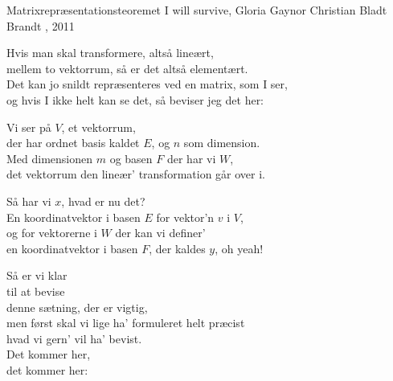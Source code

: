\begin{song}{Matrixrepræsentationsteoremet}
  {} %
  {I will survive, Gloria Gaynor} %
  {Christian Bladt Brandt} %
  {\TKET{}, 2011} %
  {\NotCCLIed} %

  \begin{SBVerse}
    Hvis man skal transformere, altså lineært,\\
    mellem to vektorrum, så er det altså elementært.\\
    Det kan jo snildt repræsenteres ved en matrix, som I ser,\\
    og hvis I ikke helt kan se det, så beviser jeg det her:
  \end{SBVerse}

  \begin{SBVerse}
    Vi ser på $V$, et vektorrum,\\
    der har ordnet basis kaldet $E$, og $n$ som dimension.\\
    Med dimensionen $m$ og basen $F$ der har vi $W$,\\
    det vektorrum den lineær’ transformation går over i.
  \end{SBVerse}

  \begin{SBVerse}
    Så har vi $x$, hvad er nu det?\\
    En koordinatvektor i basen $E$ for vektor’n $v$ i $V$,\\
    og for vektorerne i $W$ der kan vi definer’\\
    en koordinatvektor i basen $F$, der kaldes $y$, oh yeah!
  \end{SBVerse}

  \begin{SBChorus}
    Så er vi klar\\
    til at bevise\\
    denne sætning, der er vigtig,\\
    men først skal vi lige ha’ formuleret helt præcist\\
    hvad vi gern’ vil ha’ bevist.\\
    Det kommer her,\\
    det kommer her:
  \end{SBChorus}


\end{song}
